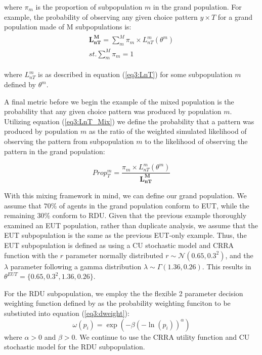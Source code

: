 \documentclass[../main.tex]{subfiles}
\begin{document}
\noindent where $\pi_m$ is the proportion of subpopulation $m$ in the grand population.
For example, the probability of observing any given choice pattern $y \times T$ for a grand population made of M subpopulations is:
\begin{align}
	\label{eq3:LnT_Mix}
	\begin{split}
		\bm{L_{nT}^M} = \sum_m^M \pi_m \times L_{nT}^m(\theta^m) \\ 
		\mathit{st.} \sum_m^M \pi_m = 1
	\end{split}
\end{align}

\noindent where $L_{nT}^m$ is as described in equation (\ref{eq3:LnT}) for some subpopulation $m$ defined by $\theta^m$.

A final metric before we begin the example of the mixed population is the probability that any given choice pattern was produced by population $m$.
Utilizing equation (\ref{eq3:LnT_Mix}) we define the probability that a pattern was produced by population $m$ as the ratio of the weighted simulated likelihood of observing the pattern from subpopulation $m$ to the likelihood of observing the pattern in the grand population:

\begin{equation}
	\label{eq3:Propm}
	\mathit{Prop^m_{T}} = \frac{\pi_m \times L_{nT}^m(\theta^m) }{\bm{L_{nT}^M}}
\end{equation}

With this mixing framework in mind, we can define our grand population.
We assume that $70\%$ of agents in the grand population conform to EUT, while the remaining $30\%$ conform to RDU.
Given that the previous example thoroughly examined an EUT population, rather than duplicate analysis, we assume that the EUT subpopulation is the same as the previous EUT-only example.
Thus, the EUT subpopulation is defined as using a CU stochastic model and CRRA function with the $r$ parameter normally distributed $r \sim \mathcal{N}(0.65 , 0.3^2 )$, and the $\lambda$ parameter following a gamma distribution $\lambda \sim \Gamma(1.36 , 0.26)$.
This results in $\theta^{EUT} = \lbrace 0.65 ,0.3^2, 1.36 , 0.26\rbrace$.

For the RDU subpopulation, we employ the the flexible 2 parameter decision weighting function defined by \textcite{Prelec1998} as the probability weighting funciton to be substiuted into equation (\ref{eq3:dweight}):
\begin{equation}
	\label{eq3:pw:pre}
	\omega(p_i)=\exp(-\beta(-\ln(p_i))^\alpha)
\end{equation}
\noindent where $\alpha > 0$ and $\beta > 0$.
We continue to use the CRRA utility function and CU stochastic model for the RDU subpopulation.
\end{document}

